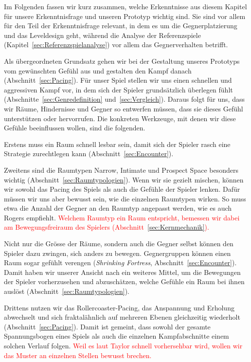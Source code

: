 \documentclass[../Main.tex]{subfiles}
\begin{document}
Im Folgenden fassen wir kurz zusammen, welche Erkenntnisse aus diesem Kapitel für unsere Erkenntnisfrage und unseren Prototyp wichtig sind. Sie sind vor allem für den Teil der Erkenntnisfrage relevant, in dem es um die Gegnerplatzierung und das Leveldesign geht, während die Analyse der Referenzspiele (Kapitel~\ref{sec:Referenzspielanalyse}) vor allem das Gegnerverhalten betrifft.

Als übergeordneten Grundsatz gehen wir bei der Gestaltung unseres Prototyps vom gewünschten Gefühl aus und gestalten den Kampf danach (Abschnitt~\ref{sec:Pacing}). Für unser Spiel stellen wir uns einen schnellen und aggressiven Kampf vor, in dem sich der Spieler grundsätzlich überlegen fühlt (Abschnitte~\ref{sec:Genredefinition} und~\ref{sec:Vergleich}). Daraus folgt für uns, dass wir Räume, Hindernisse und Gegner so entwerfen müssen, dass sie dieses Gefühl unterstützen oder hervorrufen. Die konkreten Werkzeuge, mit denen wir diese Gefühle beeinflussen wollen, sind die folgenden.

Erstens muss ein Raum schnell lesbar sein, damit sich der Spieler rasch eine Strategie zurechtlegen kann (Abschnitt~\ref{sec:Encounter}).

Zweitens sind die Raumtypen Narrow, Intimate und Prospect Space besonders wichtig (Abschnitt~\ref{sec:Raumtypologien}). Wenn wir sie gezielt mischen, können wir sowohl das Pacing des Spiels als auch die Gefühle der Spieler lenken. Dafür müssen wir uns aber bewusst sein, wie die einzelnen Raumtypen wirken. So muss etwa die Anzahl der Gegner an den Raumtyp angepasst werden, wie es auch Rogers empfiehlt.\autocite[245]{rogers2014levelup} \textcolor{red}{Welchem Raumtyp ein Raum entspricht, bemessen wir dabei am Bewegungsfreiraum des Spielers (Abschnitt~\ref{sec:Kernmechanik}).}

Nicht nur die Grösse der Räume, sondern auch die Gegner selbst können den Spieler dazu zwingen, sich anders zu bewegen. Gegnergruppen können einen Raum sogar gefühlt verengen (\textit{Shrinking Fortress}, Abschnitt~\ref{sec:Encounter}). Damit haben wir unserer Ansicht nach ein weiteres Mittel, um die Bewegungen der Spieler vorherzusehen und abzuschätzen, welche Gefühle ein Raum bei ihnen auslöst (Abschnitt~\ref{sec:Raumtypologien}).

Drittens nutzen wir das Rollercoaster-Pacing, das Anspannung und Erholung abwechselt und sich fraktalähnlich auf mehreren Ebenen gleichzeitig wiederholt (Abschnitt~\ref{sec:Pacing}). Damit ist gemeint, dass sowohl der gesamte Spannungsbogen eines Spiels als auch die einzelnen Kampfabschnitte einem solchen Verlauf folgen. \textcolor{red}{Weil es laut Taylor schnell vorhersehbar wird, wollen wir das Muster an einzelnen Stellen bewusst brechen.}
\end{document}
